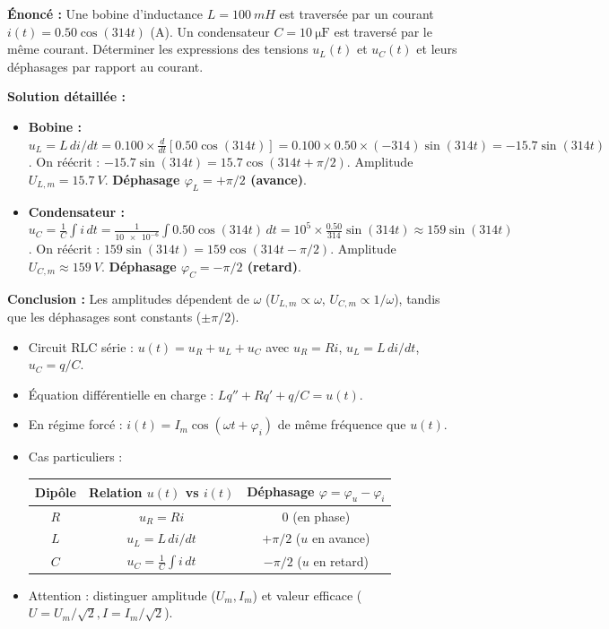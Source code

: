 \documentclass[11pt]{article}
\begin{document}
\begin{exoresolu}
\textbf{Énoncé :} Une bobine d'inductance $L = \SI{100}{mH}$ est traversée par un courant $i(t) = \num{0,50}\cos(314 t)$ (A). Un condensateur $C = \SI{10}{\micro\farad}$ est traversé par le même courant. Déterminer les expressions des tensions $u_L(t)$ et $u_C(t)$ et leurs déphasages par rapport au courant.

\textbf{Solution détaillée :}
\begin{itemize}
    \item \textbf{Bobine :} $u_L = L\,di/dt = \num{0,100} \times \frac{d}{dt}[\num{0,50}\cos(314 t)] = \num{0,100} \times \num{0,50} \times (-314)\sin(314 t) = -\num{15,7}\sin(314 t)$.
    On réécrit : $-\num{15,7}\sin(314 t) = \num{15,7}\cos(314 t + \pi/2)$.
    Amplitude $U_{L,m} = \SI{15,7}{V}$. \textbf{Déphasage $\varphi_L = +\pi/2$ (avance)}.
    
    \item \textbf{Condensateur :} $u_C = \frac{1}{C}\int i\,dt = \frac{1}{\num{10e-6}}\int \num{0,50}\cos(314 t)\,dt = 10^5 \times \frac{\num{0,50}}{314}\sin(314 t) \approx \num{159}\sin(314 t)$.
    On réécrit : $\num{159}\sin(314 t) = \num{159}\cos(314 t - \pi/2)$.
    Amplitude $U_{C,m} \approx \SI{159}{V}$. \textbf{Déphasage $\varphi_C = -\pi/2$ (retard)}.
\end{itemize}
\textbf{Conclusion :} Les amplitudes dépendent de $\omega$ ($U_{L,m} \propto \omega$, $U_{C,m} \propto 1/\omega$), tandis que les déphasages sont constants ($\pm\pi/2$).
\end{exoresolu}

\begin{aretenir}
\begin{itemize}
    \item Circuit RLC série : $u(t) = u_R + u_L + u_C$ avec $u_R=Ri$, $u_L=L\,di/dt$, $u_C=q/C$.
    \item Équation différentielle en charge : $L q'' + R q' + q/C = u(t)$.
    \item En régime forcé : $i(t) = I_m\cos(\omega t + \varphi_i)$ de même fréquence que $u(t)$.
    \item Cas particuliers :
    \begin{center}
    \begin{tabular}{|c|c|c|}\hline
    Dipôle & Relation $u(t)$ vs $i(t)$ & Déphasage $\varphi = \varphi_u - \varphi_i$ \\ \hline
    $R$ & $u_R = R i$ & $0$ (en phase) \\ \hline
    $L$ & $u_L = L\,di/dt$ & $+\pi/2$ ($u$ en avance) \\ \hline
    $C$ & $u_C = \frac{1}{C}\int i\,dt$ & $-\pi/2$ ($u$ en retard) \\ \hline
    \end{tabular}
    \end{center}
    \item Attention : distinguer amplitude ($U_m, I_m$) et valeur efficace ($U = U_m/\sqrt{2}, I = I_m/\sqrt{2}$).
\end{itemize}
\end{aretenir}
\end{document}
